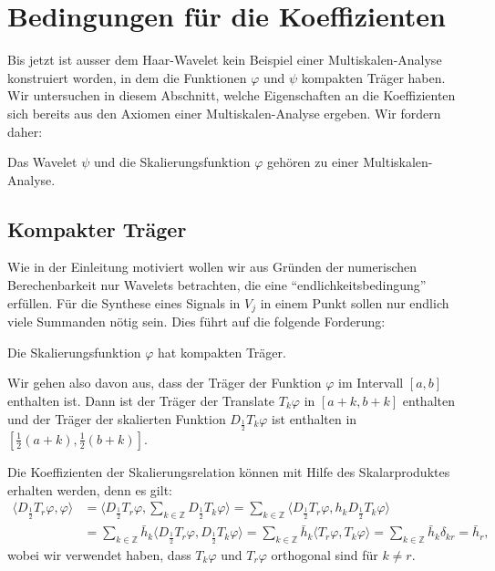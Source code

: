 %
%
%
\section{Bedingungen für die Koeffizienten\label{section:bedingungen}}
Bis jetzt ist ausser dem Haar-Wavelet kein Beispiel einer
Multiskalen-Analyse konstruiert worden, in dem die Funktionen 
$\varphi$ und $\psi$ kompakten Träger haben.
Wir untersuchen in diesem Abschnitt, welche Eigenschaften an die 
Koeffizienten sich bereits aus den Axiomen einer Multiskalen-Analyse
ergeben.
Wir fordern daher:

\begin{forderung}
\label{forderung:msa}
Das Wavelet $\psi$ und die Skalierungsfunktion $\varphi$ gehören zu
einer Multiskalen-Analyse.
\end{forderung}

\subsection{Kompakter Träger}
%
%
Wie in der Einleitung motiviert wollen wir aus Gründen der numerischen
Berechenbarkeit nur Wavelets betrachten, die eine ``endlichkeitsbedingung''
erfüllen.
Für die Synthese eines Signals in $V_j$ in einem Punkt sollen nur endlich
viele Summanden nötig sein.
Dies führt auf die folgende Forderung:

\begin{forderung}
\label{forderung:kompakt}
Die Skalierungsfunktion $\varphi$ hat kompakten Träger.
\end{forderung}

Wir gehen also davon aus, dass der Träger der Funktion $\varphi$ im Intervall
$[a,b]$ enthalten ist.
Dann ist der Träger der Translate $T_k\varphi$ in $[a+k,b+k]$ enthalten
und der Träger der skalierten Funktion $D_{\frac12}T_k\varphi$ ist
enthalten in $[\frac12(a+k),\frac12(b+k)]$.

Die Koeffizienten der Skalierungsrelation können mit Hilfe des
Skalarproduktes erhalten werden, denn es gilt:
\begin{align*}
\langle D_{\frac12}T_r\varphi, \varphi\rangle
&=
\biggl\langle
D_{\frac12}T_r\varphi, \sum_{k\in\mathbb Z} D_{\frac12}T_k\varphi
\biggr\rangle
=
\sum_{k\in\mathbb Z}
\langle
D_{\frac12}T_r\varphi,
h_kD_{\frac12}T_k\varphi
\rangle
\\
&=
\sum_{k\in\mathbb Z}
\bar{h}_k
\langle
D_{\frac12}T_r\varphi,
D_{\frac12}T_k\varphi
\rangle
=
\sum_{k\in\mathbb Z}
\bar{h}_k
\langle
T_r\varphi,
T_k\varphi
\rangle
=
\sum_{k\in\mathbb Z}
\bar{h}_k
\delta_{kr}
=
\bar{h}_r,
\end{align*}
wobei wir verwendet haben, dass $T_k\varphi$ und $T_r\varphi$ orthogonal
sind für $k\ne r$.

